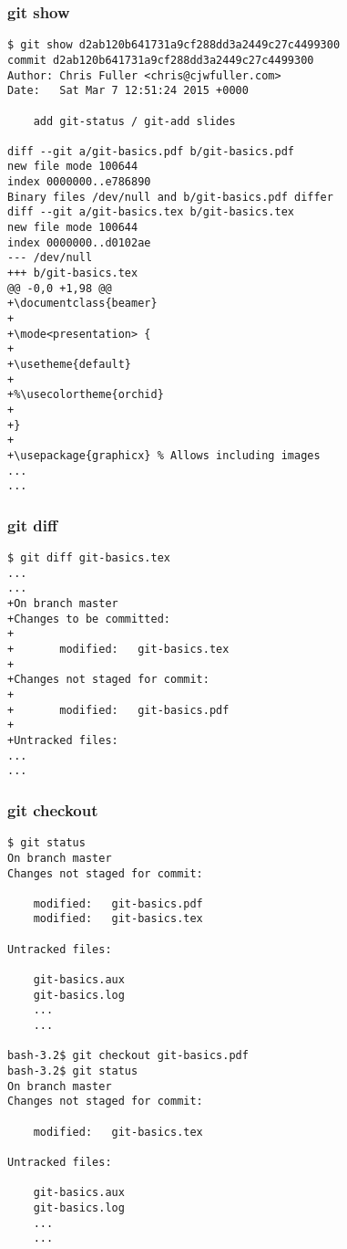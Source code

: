 \documentclass{beamer}
\begin{document}

\begin{frame}[fragile]
\frametitle{git show}
	\tiny
	\begin{verbatim}
$ git show d2ab120b641731a9cf288dd3a2449c27c4499300
commit d2ab120b641731a9cf288dd3a2449c27c4499300
Author: Chris Fuller <chris@cjwfuller.com>
Date:   Sat Mar 7 12:51:24 2015 +0000

    add git-status / git-add slides

diff --git a/git-basics.pdf b/git-basics.pdf
new file mode 100644
index 0000000..e786890
Binary files /dev/null and b/git-basics.pdf differ
diff --git a/git-basics.tex b/git-basics.tex
new file mode 100644
index 0000000..d0102ae
--- /dev/null
+++ b/git-basics.tex
@@ -0,0 +1,98 @@
+\documentclass{beamer}
+
+\mode<presentation> {
+
+\usetheme{default}
+
+%\usecolortheme{orchid}
+
+}
+
+\usepackage{graphicx} % Allows including images
...
...
	\end{verbatim}
\end{frame}


\begin{frame}[fragile]
\frametitle{git diff}
	\tiny
	\begin{verbatim}
$ git diff git-basics.tex
...
...
+On branch master
+Changes to be committed:
+
+       modified:   git-basics.tex
+
+Changes not staged for commit:
+
+       modified:   git-basics.pdf
+
+Untracked files:
...
...
	\end{verbatim}
\end{frame}


\begin{frame}[fragile]
\frametitle{git checkout}
	\tiny
	\begin{verbatim}
$ git status
On branch master
Changes not staged for commit:

	modified:   git-basics.pdf
	modified:   git-basics.tex

Untracked files:

	git-basics.aux
	git-basics.log
	...
	...

bash-3.2$ git checkout git-basics.pdf
bash-3.2$ git status
On branch master
Changes not staged for commit:

	modified:   git-basics.tex

Untracked files:

	git-basics.aux
	git-basics.log
	...
	...

	\end{verbatim}
\end{frame}
\end{document}
